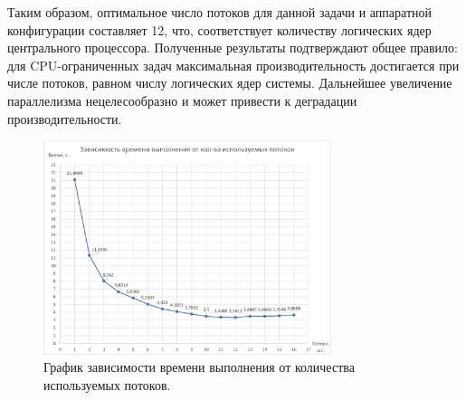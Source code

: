 Таким образом, оптимальное число потоков для данной задачи и аппаратной конфигурации составляет 12, что, соответствует количеству логических ядер центрального процессора. Полученные результаты подтверждают общее правило: для CPU-ограниченных задач максимальная производительность достигается при числе потоков, равном числу логических ядер системы. Дальнейшее увеличение параллелизма нецелесообразно и может привести к деградации производительности.
\begin{figure}[h]
    \centering
    \includegraphics[width=0.75\textwidth]{src/graph.png}
    \caption{График зависимости времени выполнения от количества используемых потоков.}
    \label{fig:graph}
\end{figure}